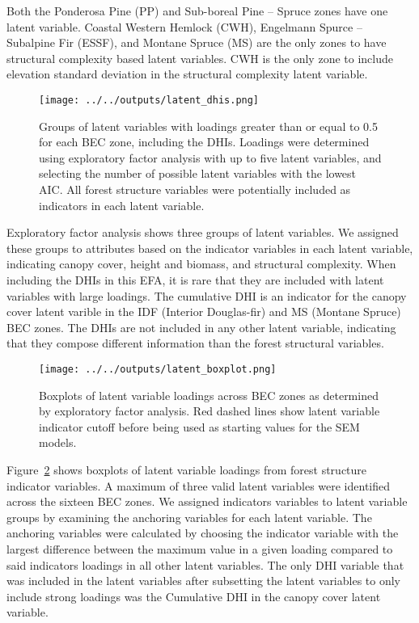 \documentclass[
  authoryear,
  review,
  3p,
  twocolumn]{elsarticle}
\begin{document}
Both the Ponderosa Pine (PP) and Sub-boreal Pine -- Spruce zones have
one latent variable. Coastal Western Hemlock (CWH), Engelmann Spurce --
Subalpine Fir (ESSF), and Montane Spruce (MS) are the only zones to have
structural complexity based latent variables. CWH is the only zone to
include elevation standard deviation in the structural complexity latent
variable.

\begin{figure}

{\centering \texttt{[image: ../../outputs/latent\_dhis.png]}

}

\caption{\label{fig-esem-latent-dhi}Groups of latent variables with
loadings greater than or equal to 0.5 for each BEC zone, including the
DHIs. Loadings were determined using exploratory factor analysis with up
to five latent variables, and selecting the number of possible latent
variables with the lowest AIC. All forest structure variables were
potentially included as indicators in each latent variable.}

\end{figure}

Exploratory factor analysis shows three groups of latent variables. We
assigned these groups to attributes based on the indicator variables in
each latent variable, indicating canopy cover, height and biomass, and
structural complexity. When including the DHIs in this EFA, it is rare
that they are included with latent variables with large loadings. The
cumulative DHI is an indicator for the canopy cover latent varible in
the IDF (Interior Douglas-fir) and MS (Montane Spruce) BEC zones. The
DHIs are not included in any other latent variable, indicating that they
compose different information than the forest structural variables.

\begin{figure}

{\centering \texttt{[image: ../../outputs/latent\_boxplot.png]}

}

\caption{\label{fig-latent-boxplots}Boxplots of latent variable loadings
across BEC zones as determined by exploratory factor analysis. Red
dashed lines show latent variable indicator cutoff before being used as
starting values for the SEM models.}

\end{figure}

Figure~\ref{fig-latent-boxplots} shows boxplots of latent variable
loadings from forest structure indicator variables. A maximum of three
valid latent variables were identified across the sixteen BEC zones. We
assigned indicators variables to latent variable groups by examining the
anchoring variables for each latent variable. The anchoring variables
were calculated by choosing the indicator variable with the largest
difference between the maximum value in a given loading compared to said
indicators loadings in all other latent variables. The only DHI variable
that was included in the latent variables after subsetting the latent
variables to only include strong loadings was the Cumulative DHI in the
canopy cover latent variable.
\end{document}
